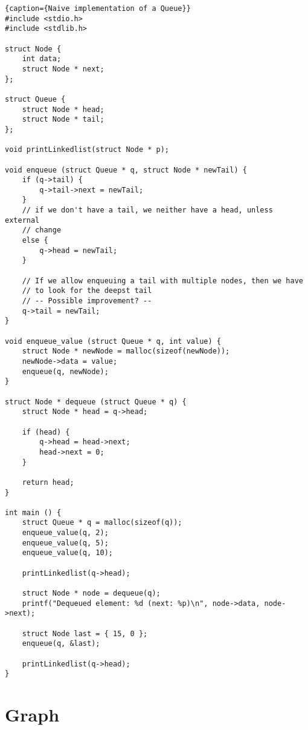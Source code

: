 \begin{lstlisting}{caption={Naive implementation of a Queue}}
#include <stdio.h>
#include <stdlib.h>

struct Node {
    int data;
    struct Node * next;
};

struct Queue {
    struct Node * head;
    struct Node * tail;
};

void printLinkedlist(struct Node * p);

void enqueue (struct Queue * q, struct Node * newTail) {
    if (q->tail) {
        q->tail->next = newTail;
    }
    // if we don't have a tail, we neither have a head, unless external
    // change
    else {
        q->head = newTail;
    }

    // If we allow enqueuing a tail with multiple nodes, then we have
    // to look for the deepst tail
    // -- Possible improvement? --
    q->tail = newTail;
}

void enqueue_value (struct Queue * q, int value) {
    struct Node * newNode = malloc(sizeof(newNode));
    newNode->data = value;
    enqueue(q, newNode);
}

struct Node * dequeue (struct Queue * q) {
    struct Node * head = q->head;

    if (head) {
        q->head = head->next;
        head->next = 0;
    }

    return head;
}

int main () {
    struct Queue * q = malloc(sizeof(q));
    enqueue_value(q, 2);
    enqueue_value(q, 5);
    enqueue_value(q, 10);

    printLinkedlist(q->head);

    struct Node * node = dequeue(q);
    printf("Dequeued element: %d (next: %p)\n", node->data, node->next);

    struct Node last = { 15, 0 };
    enqueue(q, &last);

    printLinkedlist(q->head);
}
\end{lstlisting}


%
%
\section{Graph}



